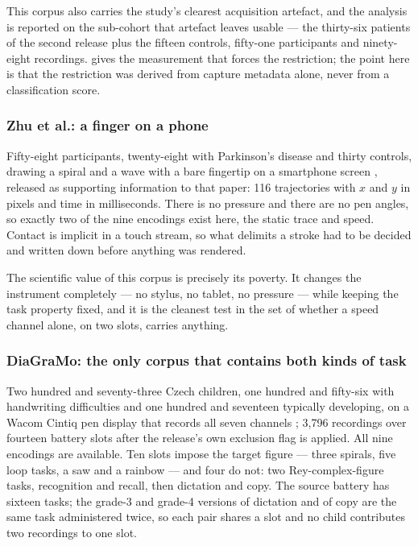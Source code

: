 This corpus also carries the study's clearest acquisition artefact, and the analysis is reported on
the sub-cohort that artefact leaves usable --- the thirty-six patients of the second release plus
the fifteen controls, fifty-one participants and ninety-eight recordings.  gives
the measurement that forces the restriction; the point here is that the restriction was derived
from capture metadata alone, never from a classification score.

\subsubsection{Zhu et al.: a finger on a phone}
\label{sec:zhu}

Fifty-eight participants, twenty-eight with Parkinson's disease and thirty controls, drawing a
spiral and a wave with a bare fingertip on a smartphone screen \citep{zhu2025smartphone}, released
as supporting information to that paper: 116 trajectories with $x$ and $y$ in pixels and time in
milliseconds. There is no pressure and there are no pen angles, so exactly two of the nine
encodings exist here, the static trace and speed. Contact is implicit in a touch stream, so what
delimits a stroke had to be decided and written down before anything was rendered.

The scientific value of this corpus is precisely its poverty. It changes the instrument completely
--- no stylus, no tablet, no pressure --- while keeping the task property fixed, and it is the
cleanest test in the set of whether a speed channel alone, on two slots, carries anything.

\subsubsection{DiaGraMo: the only corpus that contains both kinds of task}
\label{sec:diagramo}

Two hundred and seventy-three Czech children, one hundred and fifty-six with handwriting
difficulties and one hundred and seventeen typically developing, on a Wacom Cintiq pen display that
records all seven channels \citep{zvoncakova2026diagramo}; 3,796 recordings over fourteen battery
slots after the release's own exclusion flag is applied. All nine encodings are available. Ten
slots impose the target figure --- three spirals, five loop tasks, a saw and a rainbow --- and four
do not: two Rey-complex-figure tasks, recognition and recall, then dictation and copy. The source
battery has sixteen tasks; the grade-3 and grade-4 versions of dictation and of copy are the same
task administered twice, so each pair shares a slot and no child contributes two recordings to one
slot.

